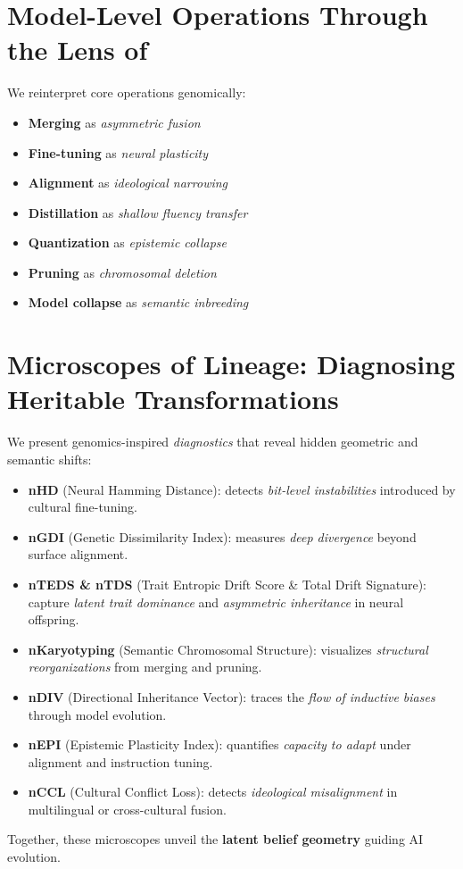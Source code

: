\section*{Model-Level Operations Through the Lens of \ndna{}}
We reinterpret core operations genomically:
\begin{itemize}[leftmargin=2em,itemsep=1pt,parsep=0pt,topsep=0pt]
  \item \textbf{Merging} as \emph{asymmetric fusion}
  \item \textbf{Fine-tuning} as \emph{neural plasticity}
  \item \textbf{Alignment} as \emph{ideological narrowing}
  \item \textbf{Distillation} as \emph{shallow fluency transfer}
  \item \textbf{Quantization} as \emph{epistemic collapse}
  \item \textbf{Pruning} as \emph{chromosomal deletion}
  \item \textbf{Model collapse} as \emph{semantic inbreeding}
\end{itemize}

\section*{Microscopes of Lineage: Diagnosing Heritable Transformations}
We present genomics-inspired \emph{diagnostics} that reveal hidden geometric and semantic shifts:
\begin{itemize}[leftmargin=2em,itemsep=1pt,parsep=0pt,topsep=0pt]
  \item \textbf{nHD} (Neural Hamming Distance): detects \emph{bit-level instabilities} introduced by cultural fine-tuning.
  \item \textbf{nGDI} (Genetic Dissimilarity Index): measures \emph{deep divergence} beyond surface alignment.
  \item \textbf{nTEDS \& nTDS} (Trait Entropic Drift Score \& Total Drift Signature): capture \emph{latent trait dominance} and \emph{asymmetric inheritance} in neural offspring.
  \item \textbf{nKaryotyping} (Semantic Chromosomal Structure): visualizes \emph{structural reorganizations} from merging and pruning.
  \item \textbf{nDIV} (Directional Inheritance Vector): traces the \emph{flow of inductive biases} through model evolution.
  \item \textbf{nEPI} (Epistemic Plasticity Index): quantifies \emph{capacity to adapt} under alignment and instruction tuning.
  \item \textbf{nCCL} (Cultural Conflict Loss): detects \emph{ideological misalignment} in multilingual or cross-cultural fusion.
\end{itemize}
Together, these microscopes unveil the \textbf{latent belief geometry} guiding AI evolution.

